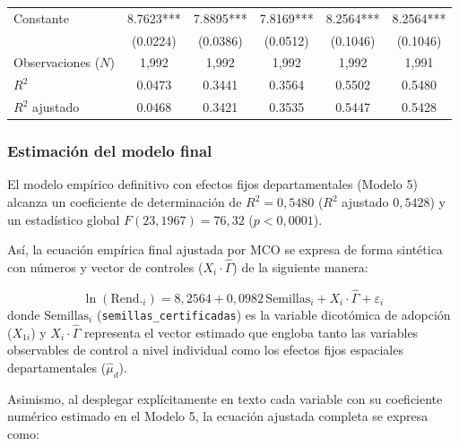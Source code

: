 \documentclass[11pt,a4paper,twocolumn]{article}
\newcommand{\semcert}{\text{Semillas}}
\begin{document}
\begin{table}[t]
\begin{tabular*}{\textwidth}{@{\extracolsep{\fill}}lccccc@{}}
Constante					& 8.7623*** & 7.8895*** & 7.8169*** & 8.2564*** & {8.2564***} \\
                            & (0.0224)  & (0.0386) & (0.0512) & (0.1046)  & {(0.1046)} \\
\midrule
Observaciones ($N$)         & 1,992     & 1,992    & 1,992    & 1,992    & {1,991} \\
$R^2$                       & 0.0473    & 0.3441   & 0.3564   & 0.5502   & {0.5480} \\
$R^2$ ajustado              & 0.0468    & 0.3421   & 0.3535   & 0.5447   & {0.5428} \\
\bottomrule
\end{tabular*}
\vspace{2pt}\par{}
\end{table}

\subsubsection{Estimación del modelo final}
El modelo empírico definitivo con efectos fijos departamentales (Modelo 5) alcanza un coeficiente de determinación de $R^2 = 0{,}5480$ ($R^2$ ajustado $0{,}5428$) y un estadístico global $F(23, 1967) = 76{,}32$ ($p < 0{,}0001$). 

Así, la ecuación empírica final ajustada por MCO se expresa de forma sintética con números y vector de controles ($X_i \cdot \hat{\Gamma}$) de la siguiente manera:

\begin{equation}
\ln(\text{Rend.}_i) = 8{,}2564 + 0{,}0982 \, \semcert_i + X_i \cdot \hat{\Gamma} + \varepsilon_i
\end{equation}
donde $\semcert_i$ (\texttt{semillas\_certificadas}) es la variable dicotómica de adopción ($X_{1i}$) y $X_i \cdot \hat{\Gamma}$ representa el vector estimado que engloba tanto las variables observables de control a nivel individual como los efectos fijos espaciales departamentales ($\hat{\mu}_d$).

Asimismo, al desplegar explícitamente en texto cada variable con su coeficiente numérico estimado en el Modelo 5, la ecuación ajustada completa se expresa como:
\end{document}
